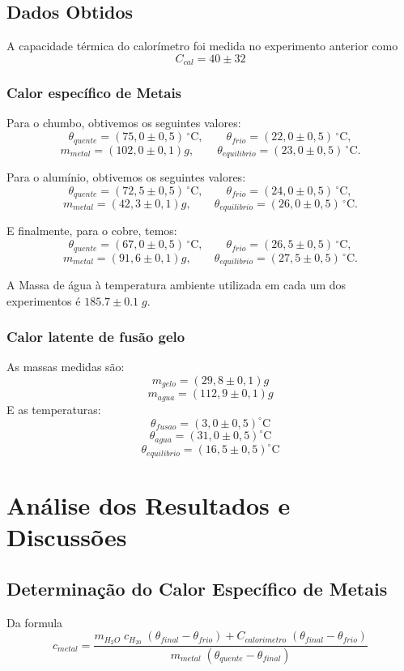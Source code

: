 \documentclass[12pt,a4paper]{article}
\begin{document}
\subsection{Dados Obtidos}

A capacidade térmica do calorímetro foi medida no experimento anterior como
$$ C_{cal} = 40 \pm 32 $$
\subsubsection{Calor específico de Metais}
Para o chumbo, obtivemos os seguintes valores:
$$ \theta_{quente} = (75,0 \pm 0,5)\,^{\circ}\mathrm{C}, \qquad \theta_{frio} = (22,0 \pm 0,5)\,^{\circ}\mathrm{C}, $$
$$ m_{metal} = (102,0 \pm 0,1)g, \qquad \theta_{equilibrio} = (23,0 \pm 0,5)\,^{\circ}\mathrm{C}. $$


Para o alumínio, obtivemos os seguintes valores:
$$ \theta_{quente} = (72,5 \pm 0,5)\,^{\circ}\mathrm{C}, \qquad \theta_{frio} = (24,0 \pm 0,5)\,^{\circ}\mathrm{C}, $$
$$ m_{metal} = (42,3 \pm 0,1)g, \qquad \theta_{equilibrio} = (26,0 \pm 0,5)\,^{\circ}\mathrm{C}. $$


 E finalmente, para o cobre, temos:
$$ \theta_{quente} = (67,0 \pm 0,5)\,^{\circ}\mathrm{C}, \qquad \theta_{frio} = (26,5 \pm 0,5)\,^{\circ}\mathrm{C}, $$
$$ m_{metal} = (91,6 \pm 0,1)g, \qquad \theta_{equilibrio} = (27,5 \pm 0,5)\,^{\circ}\mathrm{C}. $$

A Massa de água à temperatura ambiente utilizada em cada um dos experimentos é $185.7 \pm 0.1 \; g$.

\subsubsection{Calor latente de fusão gelo}
As massas medidas são:
$$ m_{gelo} = (29,8 \pm 0,1) g $$
$$ m_{agua} = (112,9 \pm 0,1)g $$
E as temperaturas:
$$ \theta_{fusao} = (3,0 \pm 0,5)^{\circ}\mathrm{C} $$
$$ \theta_{agua} = (31,0 \pm 0,5)^{\circ}\mathrm{C} $$
$$ \theta_{equilibrio} = (16,5 \pm 0,5)^{\circ}\mathrm{C} $$
\section{Análise dos Resultados e Discussões}

\subsection{Determinação do Calor Específico de Metais}
Da formula 
$$c_{metal} = \frac{m_{H_2O} \; c_{H_20} \;  (\theta_{final} - \theta_{frio}) + C_{calorimetro} \; (\theta_{final} - \theta_{frio})}{m_{metal} \;(\theta_{quente} - \theta_{final})}$$\
\end{document}
